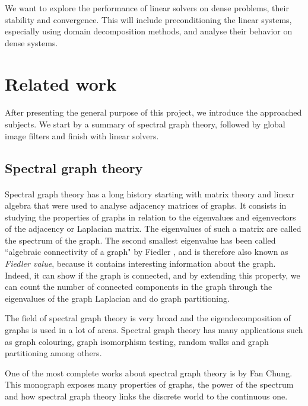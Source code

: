 We want to explore the performance of linear solvers on dense problems, their stability and convergence.
This will include preconditioning the linear systems, especially using domain decomposition methods, and analyse their behavior on dense systems.

\section{Related work}

\paragraph{}
After presenting the general purpose of this project, we introduce the approached subjects.
We start by a summary of spectral graph theory, followed by global image filters and finish with linear solvers.

\subsection{Spectral graph theory}

\paragraph{}
Spectral graph theory has a long history starting with matrix theory and linear algebra that were used to analyse adjacency matrices of graphs.
It consists in studying the properties of graphs in relation to the eigenvalues and eigenvectors of the adjacency or Laplacian matrix.
The eigenvalues of such a matrix are called the spectrum of the graph.
The second smallest eigenvalue has been called ``algebraic connectivity of a graph" by Fiedler \cite{fiedler_algebraic_1973}, and is therefore also known as \textit{Fiedler value}, because it contains interesting information about the graph.
Indeed, it can show if the graph is connected, and by extending this property, we can count the number of connected components in the graph through the eigenvalues of the graph Laplacian and do graph partitioning.

The field of spectral graph theory is very broad and the eigendecomposition of graphs is used in a lot of areas.
Spectral graph theory has many applications such as graph colouring, graph isomorphism testing, random walks and graph partitioning among others.

One of the most complete works about spectral graph theory is \cite{chung_spectral_1997} by Fan Chung.
This monograph exposes many properties of graphs, the power of the spectrum and how spectral graph theory links the discrete world to the continuous one.

